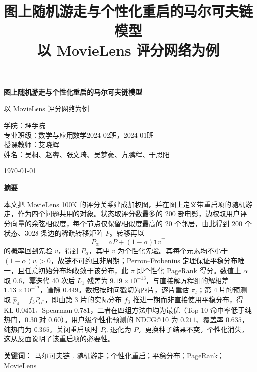 \documentclass[12pt,a4paper]{ctexart}
\title{\vspace{-1.2cm}\textbf{图上随机游走与个性化重启的马尔可夫链模型}\\[4pt]
\large 以 MovieLens 评分网络为例}
\author{}
\date{}
\begin{document}
\begin{titlepage}
\centering
\vspace*{2.2cm}
{\bfseries 图上随机游走与个性化重启的马尔可夫链模型\par}
\vspace{0.5cm}
{ 以 MovieLens 评分网络为例\par}
\vspace{3.2cm}
{
\centering
学\hspace{1em}院：理学院\\[10pt]
专业班级：数学与应用数学2024-02班，2024-01班\\[18pt]
授课教师：艾晓辉\\[18pt]
姓\hspace{1em}名：{吴桐、赵睿、张文琦、吴梦豪、方鹏程、于思阳}\par}
\vfill
{\today\par}
\end{titlepage}

\begin{center}
{\bfseries 摘\quad 要}
\end{center}

本文把 MovieLens 100K 的评分关系建成加权图，并在图上定义带重启项的随机游走，作为四个问题共用的对象。状态取评分数最多的 200 部电影，边权取用户评分向量的余弦相似度，每个节点仅保留相似度最高的 20 个邻居，由此得到 $200$ 个状态、$3028$ 条边的稀疏转移矩阵 $P$。转移再以
\[
P_{\alpha}=\alpha P+(1-\alpha)\mathbf{1}v^{\top}
\]
的概率回到先验 $v$，得到 $P_{\alpha}$，其中 $v$ 为个性化先验。其每个元素均不小于 $(1-\alpha)v_j>0$，故链不可约且非周期；Perron--Frobenius 定理保证平稳分布唯一，且任意初始分布均收敛于该分布，此 $\pi$ 即个性化 PageRank 得分。数值上 $\alpha$ 取 $0.6$，幂迭代 40 次后 $L_1$ 残差为 $9.19\times10^{-13}$，与直接解方程组的解相差 $1.13\times10^{-12}$，谱隙 $0.449$。数据按时间戳切为四片，逐片重估 $\pi_t$；第 4 片的预测取 $\hat p_4=f_3P_{\alpha^*}$，即由第 3 片的实际分布 $f_3$ 推进一期而非直接使用平稳分布，得 KL $0.0451$、Spearman $0.781$，二者在四组方法中均为最优（Top-10 命中率低于纯热门，$0.30$ 对 $0.60$）。用户级个性化预测的 NDCG@10 为 $0.211$、覆盖率 $0.635$，纯热门为 $0.365$。关闭重启项时 $P_{\alpha}$ 退化为 $P$，更换种子结果不变，个性化消失，这从反面说明了该重启项的必要性。

\vspace{0.6em}
\noindent\textbf{关键词：}\ 马尔可夫链；随机游走；个性化重启；平稳分布；PageRank；MovieLens
\end{document}

